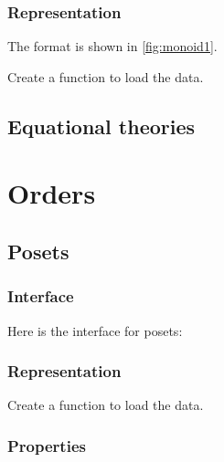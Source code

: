 
\subsection*{Representation}

The format is shown in \cref{fig:monoid1}.



\begin{exercise}[Representation]
Create a function to load the data.


%

\end{exercise}


\section{Equational theories}



\chapter{Orders}


\section{Posets}

\subsection*{Interface}

Here is the interface for posets:

%

\subsection*{Representation}


\begin{exercise}[Representation]
Create a function to load the data.


%

\end{exercise}

\subsection{Properties}


